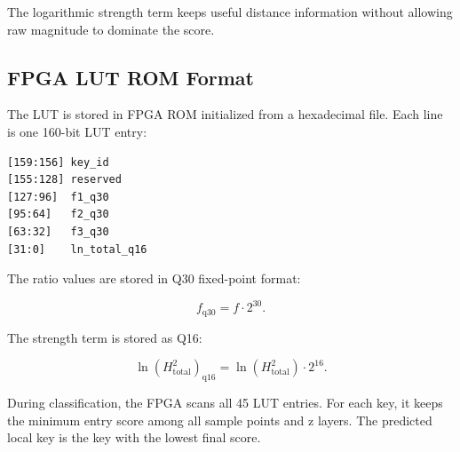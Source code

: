 The logarithmic strength term keeps useful distance information without allowing raw magnitude to dominate the score.

\subsection{FPGA LUT ROM Format}

The LUT is stored in FPGA ROM initialized from a hexadecimal  file. Each line is one 160-bit LUT entry:

\begin{lstlisting}
[159:156] key_id
[155:128] reserved
[127:96]  f1_q30
[95:64]   f2_q30
[63:32]   f3_q30
[31:0]    ln_total_q16
\end{lstlisting}

The ratio values are stored in Q30 fixed-point format:

\begin{equation}
    f_{\mathrm{q30}} = f \cdot 2^{30}.
\end{equation}

The strength term is stored as Q16:

\begin{equation}
    \ln(H_{\mathrm{total}}^2)_{\mathrm{q16}}
    = \ln(H_{\mathrm{total}}^2) \cdot 2^{16}.
\end{equation}

During classification, the FPGA scans all 45 LUT entries. For each key, it keeps the minimum entry score among all sample points and z layers. The predicted local key is the key with the lowest final score.
